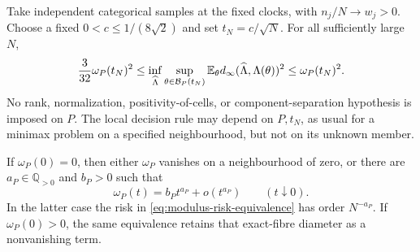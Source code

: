 \begin{theorem}
\label{thm:modulus-minimax}
Take independent categorical samples at the fixed clocks, with
$n_j/N\to w_j>0$. Choose a fixed $0<c\le1/(8\sqrt2)$ and set
$t_N=c/\sqrt N$. For all sufficiently large $N$,
\begin{equation}\label{eq:modulus-risk-equivalence}
 \frac{3}{32}\omega_P(t_N)^2
 \le \inf_{\widehat\Lambda}\sup_{\theta\in\mathcal B_P(t_N)}
       \mathbb E_\theta d_\infty(\widehat\Lambda,\Lambda(\theta))^2
 \le \omega_P(t_N)^2.
\end{equation}
No rank, normalization, positivity-of-cells, or component-separation
hypothesis is imposed on $P$. The local decision rule may depend on
$P,t_N$, as usual for a minimax problem on a specified neighbourhood,
but not on its unknown member.

If $\omega_P(0)=0$, then either $\omega_P$ vanishes on a neighbourhood
of zero, or there are $a_P\in\mathbb Q_{>0}$ and $b_P>0$ such that
\begin{equation}\label{eq:intrinsic-puiseux}
 \omega_P(t)=b_Pt^{a_P}+o(t^{a_P})\qquad(t\downarrow0).
\end{equation}
In the latter case the risk in \eqref{eq:modulus-risk-equivalence} has
order $N^{-a_P}$. If $\omega_P(0)>0$, the same equivalence retains that
exact-fibre diameter as a nonvanishing term.
\end{theorem}
